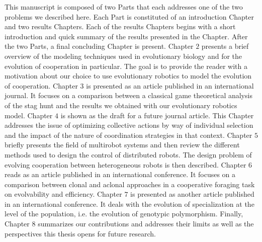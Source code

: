     This manuscript is composed of two Parts that each addresses one of the two problems we described here. Each Part is constituted of an introduction Chapter and two results Chapters. Each of the results Chapters begins with a short introduction and quick summary of the results presented in the Chapter. After the two Parts, a final concluding Chapter is present.
    Chapter $2$ presents a brief overview of the modeling techniques used in evolutionary biology and for the evolution of cooperation in particular. The goal is to provide the reader with a motivation about our choice to use evolutionary robotics to model the evolution of cooperation.
    Chapter $3$ is presented as an article published in an international journal. It focuses on a comparison between a classical game theoretical analysis of the stag hunt and the results we obtained with our evolutionary robotics model.
    Chapter $4$ is shown as the draft for a future journal article. This Chapter addresses the issue of optimizing collective actions by way of individual selection and the impact of the nature of coordination strategies in that context.
    Chapter $5$ briefly presents the field of multirobot systems and then review the different methods used to design the control of distributed robots. The design problem of evolving cooperation between heterogeneous robots is then described.
    Chapter $6$ reads as an article published in an international conference. It focuses on a comparison between clonal and aclonal approaches in a cooperative foraging task on evolvability and efficiency.
    Chapter $7$ is presented as another article published in an international conference. It deals with the evolution of specialization at the level of the population, i.e. the evolution of genotypic polymorphism.
    Finally, Chapter $8$ summarizes our contributions and addresses their limits as well as the perspectives this thesis opens for future research.
